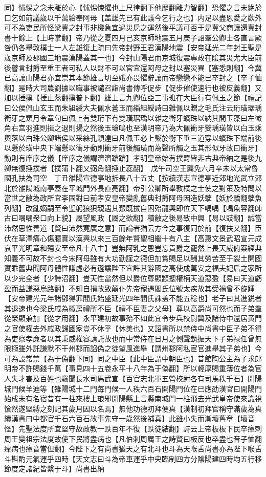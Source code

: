 同】怵惕之念未離於心【怵惕悚懼也上尺律翻下他歷翻離力智翻】恐懼之言未絶於口乞如前議歲以千萬給奉阿母【盖雄先已有此議今乞行之也】内足以盡恩愛之歡外可不為吏民所怪梁冀之封事非機急宜過災戹之運然後平議可否于是冀父商讓還冀封書十餘上【上時掌翻】帝乃從之夏四月己亥京師地震五月庚子詔羣公卿士各直言厥咎仍各舉敦樸士一人左雄復上疏曰先帝封野王君漢陽地震【安帝延光二年封王聖是歲京師及郡國三地震漢陽蓋其一也】今封山陽君而京城復震專政在隂其災尤大臣前後瞽言封爵至重王者可私人以財不可以官宜還阿母之封以塞災異【塞悉則翻】今冀已高讓山陽君亦宜崇其本節雄言切至娥亦畏懼辭讓而帝戀戀不能已卒封之【卒子恤翻】是時大司農劉據以職事被譴召詣尚書傳呼促步【促步催使速行也被皮義翻】又加以捶撲【捶止蕊翻撲普卜翻】雄上言九卿位亞三事班在大臣行有佩玉之節【禮記曰公侯佩山玄玉而朱組綬大夫佩水蒼玉而緇組綬詩曰雜佩以贈之毛氏注云珩璜琚瑀衝牙之類月令章句曰佩上有雙珩下冇雙璜琚瑀以雜之衝牙蠙珠以納其間玉藻曰左徵角右宫羽進則揖之退則揚之然後玉瑲鳴也至漢明帝乃為大佩衝牙雙瑀璜皆以白玉乘輿落以白珠公卿諸侯以采絲孔穎達曰凡佩玉必上繫於衡下垂三道穿以蠙珠下端前後以懸於璜中央下端懸以衝牙動則衝牙前後觸璜而為聲所觸之玉其形似牙故曰衝牙】動則有庠序之儀【庠序之儀謂濟濟蹌蹌】孝明皇帝始有撲罸皆非古典帝納之是後九卿無復捶撲者【撲蒲卜翻又弼角翻捶止蕊翻】　戊午司空王龔免六月辛未以太常魯國孔扶為司空　丁丑雒陽宣德亭地拆長八十五丈【按續漢志宣德亭近郊地光武立郊北於雒陽城南亭蓋在平城門外長直亮翻】帝引公卿所舉敦樸之士使之對策及特問以當世之敝為政所宜李固對曰前孝安皇帝變亂舊典封爵阿母因造妖孽【妖於驕翻孽魚列翻】改亂嫡嗣至令聖躬狼狽親遇其艱既拔自困殆龍興即位天下喁喁【喁魚容翻師古曰喁喁衆口向上貌】屬望風政【屬之欲翻】積敝之後易致中興【易以豉翻】誠當沛然思惟善道【賢曰沛然寛廣之意】而論者猶云方今之事復同於前【復扶又翻】臣伏在草澤痛心傷臆實以漢興以來三百餘年賢聖相繼十有八主【高惠文景武昭宣元成哀平光明章和殤安至帝凡十八主】豈無阿乳之恩豈忘貴爵之寵然上畏天威俯案經典知義不可故不封也今宋阿母雖有大功勤謹之德但加賞賜足以酬其勞苦至于裂土開國實乖舊典聞阿母體性謙虚必有遜讓陛下宜許其辭國之高使成萬安之福夫妃后之家所以少完全者【少詩沼翻】豈天性當然但以爵位尊顯顓摠權柄天道惡盈【易曰天道虧盈而益謙惡烏路翻】不知自損故致顛仆先帝寵遇閻氏位號太疾故其受禍曾不旋踵【安帝建光元年諸鄧得罪閻氏始盛延光四年閻氏誅盖不能五稔也】老子曰其進鋭者其退速也今梁氏戚為椒房禮所不臣【禮不臣妻之父母】尊以高爵尚可然也而子弟羣從榮顯兼加【從才用翻】永平建初故事殆不如此宜令步兵校尉冀及諸侍中還居黄門之官使權去外戚政歸國家豈不休乎【休美也】又詔書所以禁侍中尚書中臣子弟不得為吏察孝亷者以其秉威權容請託故也而中常侍在日月之側聲埶振天下子弟禄任曾無限極雖外託謙默不干州郡而諂偽之徒望風進舉【謂州郡阿私宦官進舉其子弟也】今可為設常禁【為于偽翻下同】同之中臣【此中臣謂中朝臣也】昔館陶公主為子求郎明帝不許賜錢千萬【事見四十五卷永平十八年為于偽翻】所以輕厚賜重薄位者為官人失才害及百姓也竊聞長水司馬武宣【百官志北軍五營校尉各有司馬秩千石】開陽城門候羊迪等【雒陽城十二門每門候一人秩六百石開陽門位在已應劭漢官曰開陽門始成未有名宿昔有一柱來樓上琅邪開陽縣上言縣南城門一柱飛去光武皇帝使來識視愴然遂堅縛之刻記其歲月因以名焉】無他功德初拜便真【漢制初拜官稱守滿歲為真續漢書曰中都官千石六百石故事先守一歲然後補真】此雖小失而漸壞舊章【壞音怪】先聖法度所宜堅守故政教一跌百年不復【跌徒結翻】詩云上帝板板下民卒癉刺周王變祖宗法度故使下民將盡病也【凡伯刺周厲王之詩賢曰板反也卒盡也音子恤翻癉病也癉音當但翻】今陛下之有尚書猶天之有北斗也斗為天喉舌尚書亦為陛下喉舌斗斟酌元氣運乎四時【天文志曰斗為帝車運乎中央臨制四方分隂陽建四時均五行移節度定諸紀皆繫于斗】尚書出納